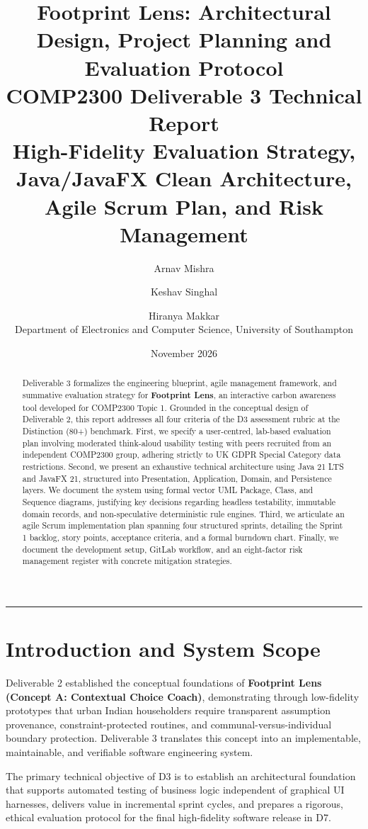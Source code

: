 \documentclass[12pt,a4paper]{article}
\title{\textbf{Footprint Lens: Architectural Design, Project Planning and Evaluation Protocol}\\[0.4em]
  \large COMP2300 Deliverable 3 Technical Report\\
  \normalsize High-Fidelity Evaluation Strategy, Java/JavaFX Clean Architecture, Agile Scrum Plan, and Risk Management}
\author{Arnav Mishra \and Keshav Singhal \and Hiranya Makkar\\[0.4em]
  \small Department of Electronics and Computer Science, University of Southampton}
\date{November 2026}
\begin{document}
\maketitle

\begin{abstract}
\noindent Deliverable 3 formalizes the engineering blueprint, agile management framework, and summative evaluation strategy for \textbf{Footprint Lens}, an interactive carbon awareness tool developed for COMP2300 Topic 1. Grounded in the conceptual design of Deliverable 2, this report addresses all four criteria of the D3 assessment rubric at the Distinction (80+) benchmark. First, we specify a user-centred, lab-based evaluation plan involving moderated think-aloud usability testing with peers recruited from an independent COMP2300 group, adhering strictly to UK GDPR Special Category data restrictions. Second, we present an exhaustive technical architecture using Java 21 LTS and JavaFX 21, structured into Presentation, Application, Domain, and Persistence layers. We document the system using formal vector UML Package, Class, and Sequence diagrams, justifying key decisions regarding headless testability, immutable domain records, and non-speculative deterministic rule engines. Third, we articulate an agile Scrum implementation plan spanning four structured sprints, detailing the Sprint 1 backlog, story points, acceptance criteria, and a formal burndown chart. Finally, we document the development setup, GitLab workflow, and an eight-factor risk management register with concrete mitigation strategies.
\end{abstract}

\hrule
\vspace{0.8em}

\section{Introduction and System Scope}
Deliverable 2 established the conceptual foundations of \textbf{Footprint Lens (Concept A: Contextual Choice Coach)}, demonstrating through low-fidelity prototypes that urban Indian householders require transparent assumption provenance, constraint-protected routines, and communal-versus-individual boundary protection. Deliverable 3 translates this concept into an implementable, maintainable, and verifiable software engineering system. 

The primary technical objective of D3 is to establish an architectural foundation that supports automated testing of business logic independent of graphical UI harnesses, delivers value in incremental sprint cycles, and prepares a rigorous, ethical evaluation protocol for the final high-fidelity software release in D7.
\end{document}
